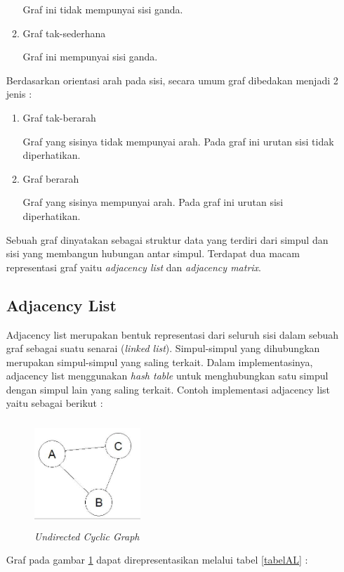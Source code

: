 \begin{enumerate}
\begin{enumerate}
	Graf ini tidak mempunyai sisi ganda.
	\item Graf tak-sederhana
	
	Graf ini mempunyai sisi ganda.
\end{enumerate}

Berdasarkan orientasi arah pada sisi, secara umum graf dibedakan menjadi 2 jenis :
\begin{enumerate}
	\item Graf tak-berarah
	
	Graf yang sisinya tidak mempunyai arah. Pada graf ini urutan sisi tidak diperhatikan.
	\item Graf berarah
	
	Graf yang sisinya mempunyai arah. Pada graf ini urutan sisi diperhatikan. \cite{referensiCA5}
\end{enumerate}

Sebuah graf dinyatakan sebagai struktur data yang terdiri dari simpul dan sisi yang membangun hubungan antar simpul. Terdapat dua macam representasi graf yaitu \textit{adjacency list} dan \textit{adjacency matrix}. \cite{referensiGraph1}
\subsection{Adjacency List}
Adjacency list merupakan bentuk representasi dari seluruh sisi dalam sebuah graf sebagai suatu senarai (\textit{linked list}). Simpul-simpul yang dihubungkan merupakan simpul-simpul yang saling terkait. Dalam implementasinya, adjacency list menggunakan \textit{hash table} untuk menghubungkan satu simpul dengan simpul lain yang saling terkait. Contoh implementasi adjacency list yaitu sebagai berikut :

 	\begin{figure} [H]
		\centering  
		\includegraphics[width=4cm, height=4cm]{adjacencylist} 
		\caption[\textit{Undirected Cyclic Graph}]{\textit{Undirected Cyclic Graph}}
		\label{fig:GambarAL} 
	\end{figure}
	
	Graf pada gambar \ref{fig:GambarAL} dapat direpresentasikan melalui tabel \ref{tabelAL} :
	

\end{enumerate}
